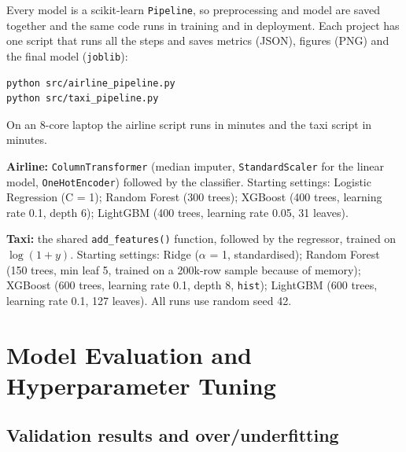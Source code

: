 \documentclass[11pt,a4paper]{article}
\begin{document}
Every model is a scikit-learn \texttt{Pipeline}, so preprocessing and model are saved together and the same code runs in training and in deployment. Each project has one script that runs all the steps and saves metrics (JSON), figures (PNG) and the final model (\texttt{joblib}):
\begin{lstlisting}
python src/airline_pipeline.py
python src/taxi_pipeline.py
\end{lstlisting}
\noindent On an 8-core laptop the airline script runs in \airRuntime{} minutes and the taxi script in \taxiRuntime{} minutes.

\noindent\textbf{Airline:} \texttt{ColumnTransformer} (median imputer, \texttt{StandardScaler} for the linear model, \texttt{OneHotEncoder}) followed by the classifier. Starting settings: Logistic Regression (C = 1); Random Forest (300 trees); XGBoost (400 trees, learning rate 0.1, depth 6); LightGBM (400 trees, learning rate 0.05, 31 leaves).

\noindent\textbf{Taxi:} the shared \texttt{add\_features()} function, followed by the regressor, trained on $\log(1+y)$. Starting settings: Ridge ($\alpha$ = 1, standardised); Random Forest (150 trees, min leaf 5, trained on a 200k-row sample because of memory); XGBoost (600 trees, learning rate 0.1, depth 8, \texttt{hist}); LightGBM (600 trees, learning rate 0.1, 127 leaves). All runs use random seed 42.

\section{Model Evaluation and Hyperparameter Tuning}

\subsection{Validation results and over/underfitting}
\end{document}
